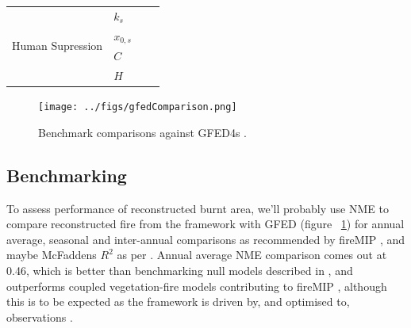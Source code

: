 \begin{table}[]
\begin{tabular}{llll}
\multirow{4}{*}{Human Supression} & $k_{s}$         &                                    &                                    \\
                                  & $x_{0, s}$      &                                    &                                    \\
                                  & $C$             &                                    &                                    \\
                                  & $H$             &                                    &                                    \\ \hline
\end{tabular}
\end{table}



\begin{figure}[!ht]
  \centering
    \texttt{[image: ../figs/gfedComparison.png]}
  \caption{Benchmark comparisons against GFED4s \citep{Giglio2013}.}
  \label{fig:benchmark}
\end{figure}

\subsection{Benchmarking}
\begin{shaded}
To assess performance of reconstructed burnt area, we'll probably use NME to compare reconstructed fire from the framework with GFED (figure ~\ref{fig:benchmark}) for annual average, seasonal and inter-annual comparisons \citep{kelley2013comprehensive} as recommended by fireMIP \citet{gmd-2016-237, hantson2016status}, and maybe McFaddens $R^{2}$ as per \citep{bistinas2014causal}. Annual average NME comparison comes out at 0.46, which is better than benchmarking null models described in \citet{kelley2013comprehensive}, and outperforms coupled vegetation-fire models contributing to fireMIP \citep{hantson2016status}, although this is to be expected as the framework is driven by, and optimised to, observations \citep{kelley2013comprehensive}.

\end{shaded}


